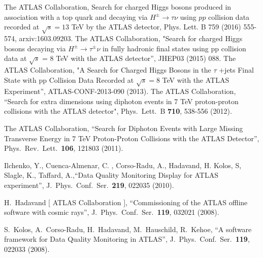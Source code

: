 \documentclass[10pt]{article}
\begin{document}
\begin{thebibliography}{99}

 {} The ATLAS Collaboration, Search for charged Higgs bosons produced in association with a top quark and decaying via $H^{\pm} \rightarrow \tau\nu$ using $pp$ collision data recorded at $\sqrt{s} = 13$ TeV by the ATLAS detector, Phys. Lett. B 759 (2016) 555-574, arxiv:1603.09203.
 {} The ATLAS Collaboration, "Search for charged Higgs bosons decaying via $H^{\pm} \rightarrow \tau^{\pm}\nu$ in fully hadronic final states using pp collision data at $\sqrt{s}$ = 8 TeV with the ATLAS detector'', JHEP03 (2015) 088.
 {} The ATLAS Collaboration, "A Search for Charged Higgs Bosons in the $\tau$ +jets Final State with pp Collision Data Recorded at $\sqrt  s = 8$ TeV with the ATLAS Experiment'', ATLAS-CONF-2013-090 (2013).
 {} The ATLAS Collaboration, ``Search for extra dimensions using diphoton events in 7 TeV proton-proton collisions with the ATLAS detector", Phys.\ Lett.\ B {\bf 710}, 538-556 (2012).

 {} The ATLAS Collaboration, ``Search for Diphoton Events with Large Missing Transverse Energy in 7 TeV Proton-Proton Collisions with the ATLAS Detector'', Phys.\ Rev.\ Lett.\  {\bf 106}, 121803 (2011).


 {} Ilchenko, Y., Cuenca-Almenar, C. , Corso-Radu, A., Hadavand, H.  Kolos, S,  Slagle, K.,  Taffard, A.,``Data Quality Monitoring Display for ATLAS experiment'', J.\ Phys.\ Conf.\ Ser.\  {\bf 219}, 022035 (2010).

  H.~Hadavand [ ATLAS Collaboration ],
  ``Commissioning of the ATLAS offline software with cosmic rays'',
  J.\ Phys.\ Conf.\ Ser.\  {\bf 119}, 032021 (2008).

  S.~Kolos, A.~Corso-Radu, H.~Hadavand, M.~Hauschild, R.~Kehoe,
  ``A software framework for Data Quality Monitoring in ATLAS'',
  J.\ Phys.\ Conf.\ Ser.\  {\bf 119}, 022033 (2008).


\end{thebibliography}
\end{document}
